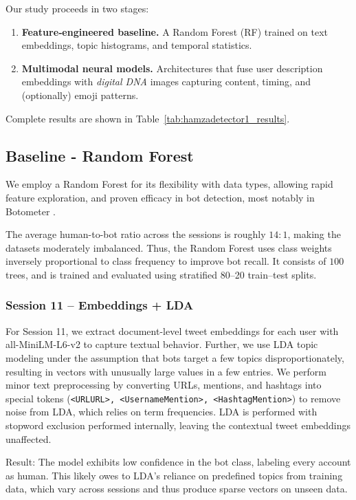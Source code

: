 \documentclass[conference]{IEEEtran}
\begin{document}
Our study proceeds in two stages:
\begin{enumerate}
\item \textbf{Feature‑engineered baseline.} A Random Forest (RF) trained on text embeddings, topic histograms, and temporal statistics.
\item \textbf{Multimodal neural models.} Architectures that fuse user description embeddings with \emph{digital DNA} images capturing content, timing, and (optionally) emoji patterns.
\end{enumerate}
Complete results are shown in Table~\ref{tab:hamzadetector1_results}.

\subsection{\textbf{Baseline - Random Forest}}
We employ a Random Forest 
for its flexibility with data types, allowing rapid feature exploration, 
and proven efficacy in bot detection, most notably in Botometer \citep{davis2016botornot}.

The average human-to-bot ratio across the sessions is 
roughly $14:1$, making the datasets moderately imbalanced.
Thus, the Random Forest uses class weights inversely proportional 
to class frequency to improve bot recall.
It consists of $100$ trees,
and is trained and evaluated 
using stratified 80–20 train–test splits.

\subsubsection{\textbf{Session 11} – Embeddings + LDA}
For Session 11, we extract 
document-level tweet 
embeddings for each user with all-MiniLM-L6-v2 \citep{reimers2021sentence}
to capture textual behavior.
Further, we use LDA \citep{blei2003latent} topic modeling under the 
assumption that bots target a few topics disproportionately, 
resulting in vectors with unusually 
large values in a few entries.  We perform minor text preprocessing by
converting URLs, mentions, and hashtags into special tokens (\texttt{<URLURL>, <UsernameMention>, <HashtagMention>}) to 
remove noise from LDA, which relies on term frequencies. LDA is performed with stopword exclusion performed internally,
leaving the contextual tweet embeddings unaffected.

Result:
The model exhibits low confidence in the bot class, labeling every account as human. 
This likely owes to LDA's reliance on predefined topics from training data, 
which vary across sessions and thus
produce sparse vectors on unseen data.
\end{document}
